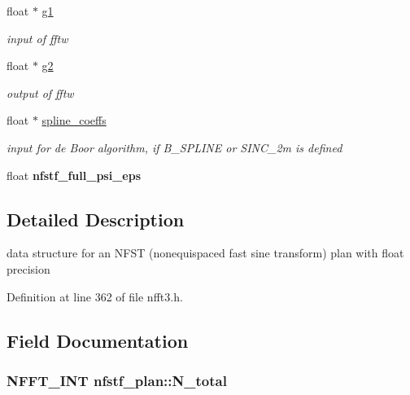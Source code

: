 \begin{DoxyCompactItemize}
\item 
\hypertarget{structnfstf__plan_a279687997f16d0fb839928f472307b39}{float $\ast$ \hyperlink{structnfstf__plan_a279687997f16d0fb839928f472307b39}{g1}}\label{structnfstf__plan_a279687997f16d0fb839928f472307b39}

\begin{DoxyCompactList}\small\item\em input of fftw \end{DoxyCompactList}\item 
\hypertarget{structnfstf__plan_a11f05420be226a83aed2e8c41a1b9bd3}{float $\ast$ \hyperlink{structnfstf__plan_a11f05420be226a83aed2e8c41a1b9bd3}{g2}}\label{structnfstf__plan_a11f05420be226a83aed2e8c41a1b9bd3}

\begin{DoxyCompactList}\small\item\em output of fftw \end{DoxyCompactList}\item 
\hypertarget{structnfstf__plan_a64c5addda16e3d789184af183900db21}{float $\ast$ \hyperlink{structnfstf__plan_a64c5addda16e3d789184af183900db21}{spline\-\_\-coeffs}}\label{structnfstf__plan_a64c5addda16e3d789184af183900db21}

\begin{DoxyCompactList}\small\item\em input for de Boor algorithm, if B\-\_\-\-S\-P\-L\-I\-N\-E or S\-I\-N\-C\-\_\-2m is defined \end{DoxyCompactList}\item 
\hypertarget{structnfstf__plan_a1d099829fe2a3b171c10861c0de594c1}{float {\bfseries nfstf\-\_\-full\-\_\-psi\-\_\-eps}}\label{structnfstf__plan_a1d099829fe2a3b171c10861c0de594c1}

\end{DoxyCompactItemize}


\subsection{Detailed Description}
data structure for an N\-F\-S\-T (nonequispaced fast sine transform) plan with float precision 

Definition at line 362 of file nfft3.\-h.



\subsection{Field Documentation}
\hypertarget{structnfstf__plan_a70b5a94f522655bf7b0a5416dfaf99ec}{
\subsubsection[{N\-\_\-total}]{\setlength{\rightskip}{0pt plus 5cm}N\-F\-F\-T\-\_\-\-I\-N\-T nfstf\-\_\-plan\-::\-N\-\_\-total}}\label{structnfstf__plan_a70b5a94f522655bf7b0a5416dfaf99ec}


